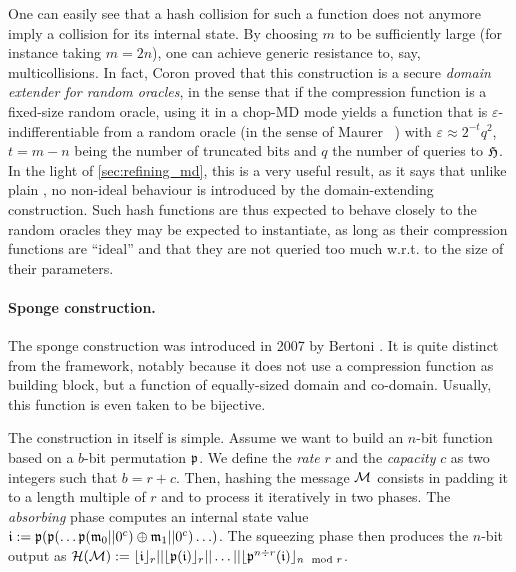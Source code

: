 One can easily see that a hash collision for such a function does not anymore imply a collision for its internal state. By choosing $m$ to be sufficiently large (for instance taking $m = 2n$),
one can achieve generic resistance to, say, multicollisions. In fact, Coron \etal proved that this construction is a secure \emph{domain extender for random oracles}, in the sense that
if the compression function is a fixed-size random oracle, using it in a chop-MD mode yields a function that is $\varepsilon$-indifferentiable from a random oracle (in the sense of Maurer \etal~\cite{DBLP:conf/tcc/MaurerRH04})
with $\varepsilon \approx 2^{-t}q^2$, $t = m - n$ being the number of truncated bits and $q$ the number of queries to $\operatorname{\mathfrak{H}}$. In the light of \autoref{sec:refining_md}, this is a very useful result, as it
says that unlike plain \merkdam, no non-ideal behaviour is introduced by the domain-extending construction. Such hash functions are thus expected to behave closely to the random oracles they may be expected to instantiate, as long as
their compression functions are ``ideal'' and that they are not queried too much w.r.t. to the size of their parameters.

\paragraph{Sponge construction.} The sponge construction was introduced in 2007 by Bertoni \etal \cite{SpongeFunctions}. It is quite distinct from the \merkdam framework, notably because it does not use a compression
function as building block, but a function of equally-sized domain and co-domain. Usually, this function is even taken to be bijective.

The construction in itself is simple. Assume we want to build an $n$-bit function based on a $b$-bit permutation $\operatorname{\mathfrak{p}}$. We define the \emph{rate} $r$ and the \emph{capacity} $c$ as two integers such that
$b = r + c$. Then, hashing the message $\mathcal{M}$ consists in padding it to a length multiple of $r$ and to process it iteratively
in two phases. The \emph{absorbing} phase computes an internal state value $\mathfrak{i} := \operatorname{\mathfrak{p}}(\operatorname{\mathfrak{p}}(\ldots\operatorname{\mathfrak{p}}(\mathfrak{m}_0||0^c)\oplus\mathfrak{m}_1||0^c)\ldots)$. The squeezing phase then produces the
$n$-bit output as $\operatorname{\mathcal{H}}(\mathcal{M}) := \lfloor\mathfrak{i}\rfloor_r||\lfloor\operatorname{\mathfrak{p}}(\mathfrak{i})\rfloor_r||\ldots||\lfloor\operatorname{\mathfrak{p}}^{n \div r}(\mathfrak{i})\rfloor_{n \mod r}$.

